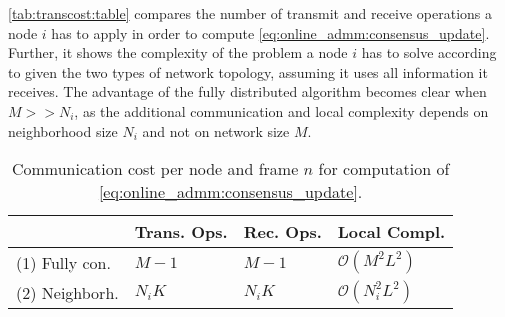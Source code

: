 \documentclass{article}
\begin{document}
\autoref{tab:transcost:table} compares the number of transmit and receive operations a node \(i\) has to apply in order to compute \eqref{eq:online_admm:consensus_update}.
Further, it shows the complexity of the problem a node \(i\) has to solve according to \cite{blochbergerDBSI} given the two types of network topology, assuming it uses all information it receives.
The advantage of the fully distributed algorithm becomes clear when \(M>>N_i\), as the additional communication and local complexity depends on neighborhood size \(N_i\) and not on network size \(M\).
\vspace*{-0.6em}
\renewcommand{\arraystretch}{1.2}
\begin{table}[h]
    \centering
    \begin{tabular}{ |l|l|l|l| }
        \hline
        & Trans. Ops. & Rec. Ops. & Local Compl. \\
        \hline\hline
        (1) Fully con. & \(M-1\) & \(M-1\) & \(\mathcal{O}(M^2 L^2)\) \\
        \hline
        (2) Neighborh. & \(N_i K\) & \(N_i K\) & \(\mathcal{O}(N_i^2 L^2)\)\\ 
        \hline
    \end{tabular}
    \caption[]{Communication cost per node and frame \(n\) for computation of \eqref{eq:online_admm:consensus_update}.}
    \label{tab:transcost:table}
\end{table}
\end{document}
